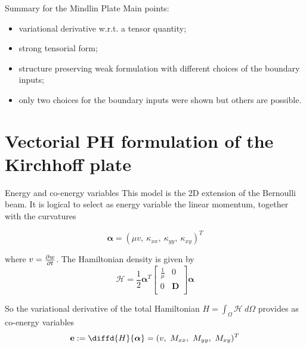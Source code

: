 \documentclass{beamer}
\begin{document}
\begin{frame}{Summary for the Mindlin Plate}
Main  points:
\begin{itemize}
\item variational derivative w.r.t. a tensor quantity;
\item strong tensorial form;
\item structure preserving weak formulation with different choices of the boundary inputs;
\item only two choices for the boundary inputs were shown but others are possible.
\end{itemize}
\end{frame}

\section{Vectorial PH formulation of the Kirchhoff plate} 

\begin{frame}{Energy and co-energy variables}
This model is the 2D extension of the Bernoulli beam. It is logical to select as energy variable the linear momentum, together with the curvatures

\begin{equation*}
\bm{\alpha} = (\mu v,\ \kappa_{xx},\ \kappa_{yy},\ \kappa_{xy})^T
\end{equation*}

where $v = \diffp{w}{t}$. The Hamiltonian density is given by 
\begin{equation*}
\mathcal{H} =\frac{1}{2} \bm{\alpha}^T \begin{bmatrix}
\frac{1}{\mu} & 0 \\
0 & \bm{D} \\
\end{bmatrix} \bm{\alpha}
\end{equation*}

So the variational derivative of the total Hamiltonian $H = \int_{\Omega} \mathcal{H} \ d\Omega$ provides as co-energy variables
\begin{equation*}
\mathbf{e} := \diffd{H}{\bm{\alpha}} = (v,\ M_{xx},\ M_{yy},\ M_{xy})^T
\end{equation*}
 
\end{frame}
\end{document}
